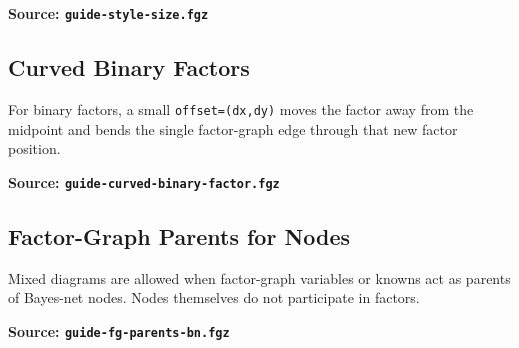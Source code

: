 \documentclass{article}
\begin{document}
\begin{samepage}
  \noindent
  \begin{minipage}[t]{0.41\textwidth}
    \centering
    \vspace{0.5cm}
    
  \end{minipage}\hfill
  \begin{minipage}[t]{0.55\textwidth}
    \textbf{Source: \texttt{guide-style-size.fgz}}
  \end{minipage}
\end{samepage}

\subsection{Curved Binary Factors}
For binary factors, a small \texttt{offset=(dx,dy)} moves the factor away from the
midpoint and bends the single factor-graph edge through that new factor position.

\begin{samepage}
  \noindent
  \begin{minipage}[t]{0.41\textwidth}
    \centering
    \vspace{0.5cm}
    
  \end{minipage}\hfill
  \begin{minipage}[t]{0.55\textwidth}
    \textbf{Source: \texttt{guide-curved-binary-factor.fgz}}
  \end{minipage}
\end{samepage}

\subsection{Factor-Graph Parents for Nodes}
Mixed diagrams are allowed when factor-graph variables or knowns act as parents of
Bayes-net nodes. Nodes themselves do not participate in factors.

\begin{samepage}
  \noindent
  \begin{minipage}[t]{0.41\textwidth}
    \centering
    \vspace{0.5cm}
    
  \end{minipage}\hfill
  \begin{minipage}[t]{0.55\textwidth}
    \textbf{Source: \texttt{guide-fg-parents-bn.fgz}}
  \end{minipage}
\end{samepage}
\end{document}
